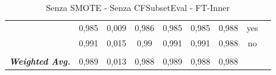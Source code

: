 \begin{table}[htbp]
{\begin{tabular}{rrrrrrrrr}
			\multicolumn{1}{c}{} & \multicolumn{1}{c}{0,985} & \multicolumn{1}{c}{0,009} & \multicolumn{1}{c}{0,986} & \multicolumn{1}{c}{0,985} & \multicolumn{1}{c}{0,985} & \multicolumn{1}{c}{0,988} & \multicolumn{1}{c}{yes} &  \\
			\multicolumn{1}{c}{} & \multicolumn{1}{c}{0,991} & \multicolumn{1}{c}{0,015} & \multicolumn{1}{c}{0,99} & \multicolumn{1}{c}{0,991} & \multicolumn{1}{c}{0,991} & \multicolumn{1}{c}{0,988} & \multicolumn{1}{c}{no} &  \\
			\multicolumn{1}{c}{} & \multicolumn{1}{c}{} & \multicolumn{1}{c}{} & \multicolumn{1}{c}{} & \multicolumn{1}{c}{} & \multicolumn{1}{c}{} & \multicolumn{1}{c}{} & \multicolumn{1}{c}{} &  \\
			\multicolumn{1}{c}{\textit{\textbf{Weighted Avg.}}} & \multicolumn{1}{c}{0,989} & \multicolumn{1}{c}{0,013} & \multicolumn{1}{c}{0,988} & \multicolumn{1}{c}{0,989} & \multicolumn{1}{c}{0,988} & \multicolumn{1}{c}{0,988} & \multicolumn{1}{c}{} &  \\
		\end{tabular}%
	}
	\label{tab:FTInner}%
	\caption{Senza SMOTE - Senza CFSubsetEval - FT-Inner}
\end{table}%

